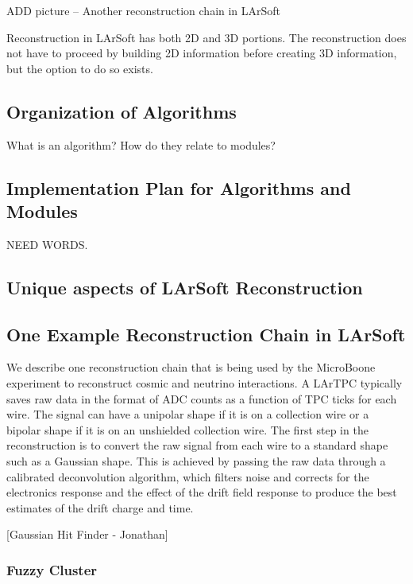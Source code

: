 \documentclass[12pt]{elsarticle}
\begin{document}
ADD picture -- Another reconstruction chain in LArSoft

Reconstruction in LArSoft has both 2D and 3D portions. The reconstruction does not have to proceed by building 2D information before creating 3D information, but the option to do so exists. 

\subsection{Organization of Algorithms}

What is an algorithm? How do they relate to modules?

\subsection{Implementation Plan for Algorithms and Modules}
NEED WORDS.

\subsection{Unique aspects of LArSoft Reconstruction}

\subsection{One Example Reconstruction Chain in LArSoft}
We describe one reconstruction chain that is being used by the MicroBoone experiment to reconstruct cosmic and neutrino interactions. A LArTPC typically saves raw data in the format of ADC counts as a function of TPC ticks for each wire. The signal can have a unipolar shape if it is on a collection wire or a bipolar shape if it is on an unshielded collection wire. The first step in the reconstruction is to convert the raw signal from each wire to a standard shape such as a Gaussian shape. This is achieved by passing the raw data through a calibrated deconvolution algorithm, which filters noise and corrects for the electronics response and the effect of the drift field response to produce the best estimates of the drift charge and time. 

[Gaussian Hit Finder - Jonathan]


\subsubsection{Fuzzy Cluster}
\end{document}
